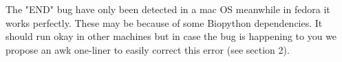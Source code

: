 \documentclass[12pt]{article}
\begin{document}
The "END" bug have only been detected in a mac OS meanwhile in fedora it works perfectly. These may be because of some Biopython dependencies. It should run okay in other machines but in case the bug is happening to you we propose an awk one-liner to easily correct this error (see section 2). 

\clearpage
\listoffigures

\end{document}
